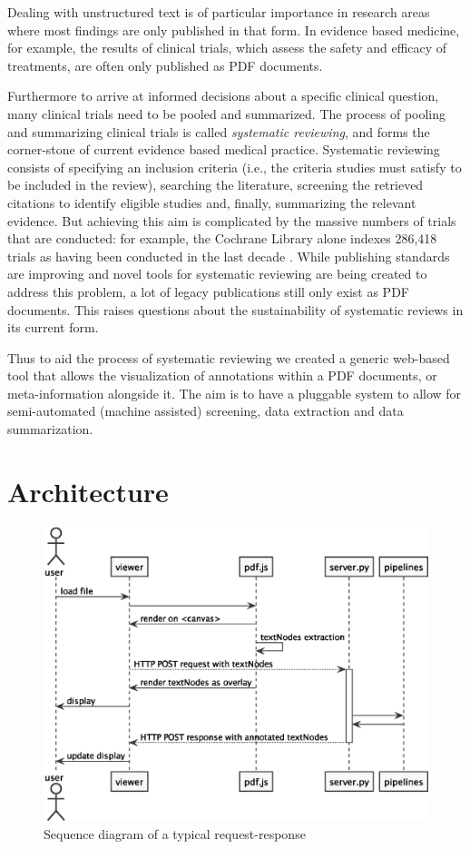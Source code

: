 \documentclass[runningheads,a4paper]{llncs}
\begin{document}
Dealing with unstructured text is of particular importance in research areas where most findings are only published in that form.
In evidence based medicine, for example, the results of clinical trials, which assess the safety and efficacy of treatments, are often only published as PDF documents.

Furthermore to arrive at informed decisions about a specific clinical question, many clinical trials need to be pooled and summarized.
The process of pooling and summarizing clinical trials is called \emph{systematic reviewing}, and forms the corner-stone of current evidence based medical practice.
Systematic reviewing consists of specifying an inclusion criteria (i.e., the criteria studies must satisfy to be included in the review), searching the literature, screening the retrieved citations to identify eligible studies and, finally, summarizing the relevant evidence.
But achieving this aim is complicated by the massive numbers of trials that are conducted: for example, the Cochrane Library alone indexes 286,418 trials as having been conducted in the last decade \cite{valkenhoef2012}.
While publishing standards are improving and novel tools for systematic reviewing are being created to address this problem, a lot of legacy publications still only exist as PDF documents.
This raises questions about the sustainability of systematic reviews in its current form.

Thus to aid the process of systematic reviewing we created a generic web-based tool that allows the visualization of annotations within a PDF documents, or meta-information alongside it.
The aim is to have a pluggable system to allow for semi-automated (machine assisted) screening, data extraction and data summarization.
\section{Architecture}
\label{sec-2}

\begin{figure}[htb]
\centering
\includegraphics[width=.9\linewidth]{sequence_diagram.eps}
\caption{\label{fig:sequence}Sequence diagram of a typical request-response}
\end{figure}
\end{document}
